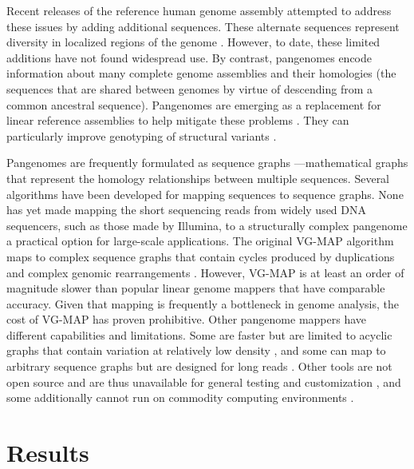 \documentclass[11pt]{ucscthesis}
\begin{document}
Recent releases of the reference human genome assembly attempted to address these issues by adding additional sequences.
These alternate sequences represent diversity in localized regions of the genome \cite{church_modernizing_2011}.
However, to date, these limited additions have not found widespread use. By contrast, pangenomes encode information about many complete genome assemblies and their homologies (the sequences that are shared between genomes by virtue of descending from a common ancestral sequence).
Pangenomes are emerging as a replacement for linear reference assemblies to help mitigate these problems \cite{noauthor_computational_2016,sherman_pan-genomics_2020,ballouz_is_2019}.
They can particularly improve genotyping of structural variants \cite{hickey_vgsv_2020}.

Pangenomes are frequently formulated as sequence graphs \cite{eizenga_pangenome_2020}—mathematical graphs that represent the homology relationships between multiple sequences.
Several algorithms have been developed for mapping sequences to sequence graphs.
None has yet made mapping the short sequencing reads from widely used DNA sequencers, such as those made by Illumina, to a structurally complex pangenome a practical option for large-scale applications.
The original VG-MAP algorithm \cite{garrison_vg_2018} maps to complex sequence graphs that contain cycles produced by duplications and complex genomic rearrangements \cite{garrison_vg_2018}.
However, VG-MAP is at least an order of magnitude slower than popular linear genome mappers that have comparable accuracy.
Given that mapping is frequently a bottleneck in genome analysis, the cost of VG-MAP has proven prohibitive. Other pangenome mappers have different capabilities and limitations.
Some are faster but are limited to acyclic graphs that contain variation at relatively low density \cite{kim_hisat2_2019}, and some can map to arbitrary sequence graphs but are designed for long reads \cite{rautiainen_graphaligner_2020}. Other tools are not open source and are thus unavailable for general testing and customization \cite{sevenbridges_2019,illumina_dragen_2019}, and some additionally cannot run on commodity computing environments \cite{illumina_dragen_2019}.

\section{Results}
\end{document}
